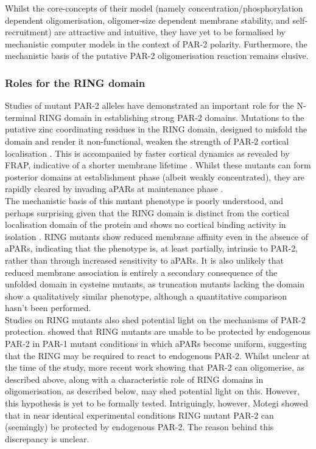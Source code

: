 \documentclass[12pt]{"article"}
\begin{document}
Whilst the core-concepts of their model (namely concentration/phosphorylation dependent oligomerisation, oligomer-size dependent membrane stability, and self-recruitment) are attractive and intuitive, they have yet to be formalised by mechanistic computer models in the context of PAR-2 polarity. Furthermore, the mechanistic basis of the putative PAR-2 oligomerisation reaction remains elusive.\\


\subsubsection{Roles for the RING domain}

Studies of mutant PAR-2 alleles have demonstrated an important role for the N-terminal RING domain in establishing strong PAR-2 domains. Mutations to the putative zinc coordinating residues in the RING domain, designed to misfold the domain and render it non-functional, weaken the strength of PAR-2 cortical localisation \citep{Hao2006}. This is accompanied by faster cortical dynamics as revealed by FRAP, indicative of a shorter membrane lifetime \citep{Motegi2011}. Whilst these mutants can form posterior domains at establishment phase (albeit weakly concentrated), they are rapidly cleared by invading aPARs at maintenance phase \citep{Hao2006}.\\

The mechanistic basis of this mutant phenotype is poorly understood, and perhaps surprising given that the RING domain is distinct from the cortical localisation domain of the protein and shows no cortical binding activity in isolation \citep{Hao2006}. RING mutants show reduced membrane affinity even in the absence of aPARs, indicating that the phenotype is, at least partially, intrinsic to PAR-2, rather than through increased sensitivity to aPARs. It is also unlikely that reduced membrane association is entirely a secondary consequence of the unfolded domain in cysteine mutants, as truncation mutants lacking the domain show a qualitatively similar phenotype, although a quantitative comparison hasn’t been performed.\\

Studies on RING mutants also shed potential light on the mechanisms of PAR-2 protection. \textcite{Hao2006} showed that RING mutants are unable to be protected by endogenous PAR-2 in PAR-1 mutant conditions in which aPARs become uniform, suggesting that the RING may be required to react to endogenous PAR-2. Whilst unclear at the time of the study, more recent work showing that PAR-2 can oligomerise, as described above, along with a characteristic role of RING domains in oligomerisation, as described below, may shed potential light on this. However, this hypothesis is yet to be formally tested. Intriguingly, however, Motegi showed that in near identical experimental conditions RING mutant PAR-2 can (seemingly) be protected by endogenous PAR-2. The reason behind this discrepancy is unclear.\\
\end{document}
